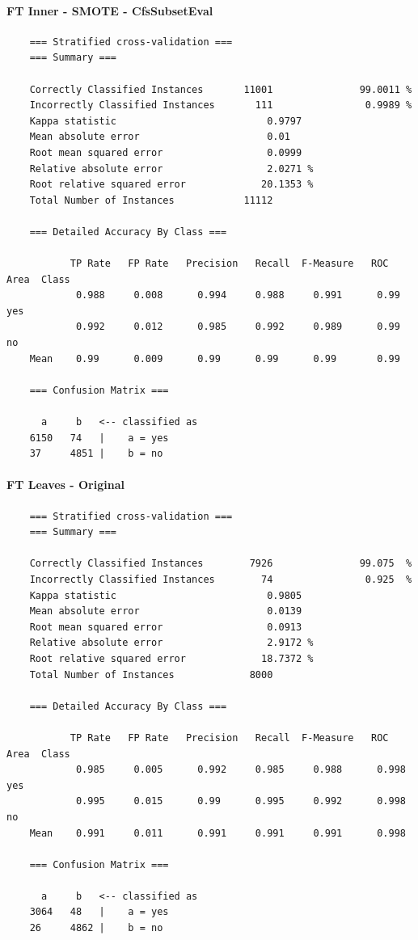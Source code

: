 \pagebreak
\paragraph{FT Inner - SMOTE - CfsSubsetEval}
{\scriptsize
	\begin{verbatim}
	=== Stratified cross-validation ===
	=== Summary ===
	
	Correctly Classified Instances       11001               99.0011 %
	Incorrectly Classified Instances       111                0.9989 %
	Kappa statistic                          0.9797
	Mean absolute error                      0.01  
	Root mean squared error                  0.0999
	Relative absolute error                  2.0271 %
	Root relative squared error             20.1353 %
	Total Number of Instances            11112     
	
	=== Detailed Accuracy By Class ===
	
	       TP Rate   FP Rate   Precision   Recall  F-Measure   ROC Area  Class
	        0.988     0.008      0.994     0.988     0.991      0.99     yes
	        0.992     0.012      0.985     0.992     0.989      0.99     no
	Mean    0.99      0.009      0.99      0.99      0.99       0.99 
	
	=== Confusion Matrix ===
	
	  a     b   <-- classified as
	6150   74   |    a = yes
	37     4851 |    b = no
	\end{verbatim}
}

\paragraph{FT Leaves - Original}
{\scriptsize
	\begin{verbatim}
	=== Stratified cross-validation ===
	=== Summary ===
	
	Correctly Classified Instances        7926               99.075  %
	Incorrectly Classified Instances        74                0.925  %
	Kappa statistic                          0.9805
	Mean absolute error                      0.0139
	Root mean squared error                  0.0913
	Relative absolute error                  2.9172 %
	Root relative squared error             18.7372 %
	Total Number of Instances             8000     
	
	=== Detailed Accuracy By Class ===
	
	       TP Rate   FP Rate   Precision   Recall  F-Measure   ROC Area  Class
	        0.985     0.005      0.992     0.985     0.988      0.998    yes
	        0.995     0.015      0.99      0.995     0.992      0.998    no
	Mean    0.991     0.011      0.991     0.991     0.991      0.998
	
	=== Confusion Matrix ===
	
	  a     b   <-- classified as
	3064   48   |    a = yes
	26     4862 |    b = no
	
	\end{verbatim}
}

